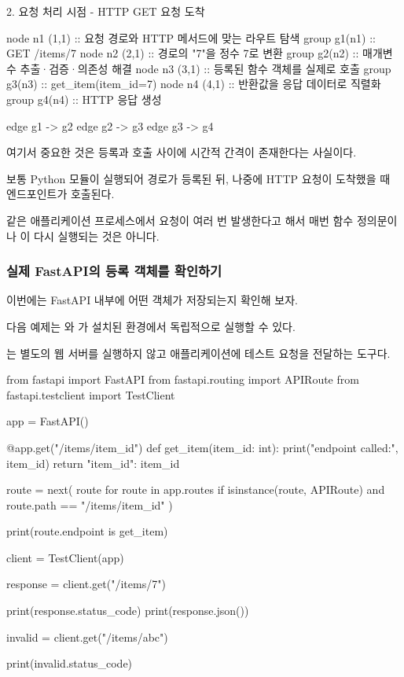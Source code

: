 \begin{dhknote}
\begin{dhksmry}[centered]
2. 요청 처리 시점 - HTTP GET 요청 도착
\end{dhksmry}
\end{dhknote}

\begin{dhkgraph}[uniform]
node n1 (1,1) :: 요청 경로와 HTTP 메서드에 맞는 라우트 탐색
group g1(n1) :: GET /items/7 
node n2 (2,1) :: 경로의 "7"을 정수 7로 변환
group g2(n2) :: 매개변수 추출·검증·의존성 해결 
node n3 (3,1) :: 등록된 함수 객체를 실제로 호출
group g3(n3) :: get_item(item_id=7)
node n4 (4,1) :: 반환값을 응답 데이터로 직렬화
group g4(n4) :: HTTP 응답 생성

edge g1 -> g2
edge g2 -> g3
edge g3 -> g4
\end{dhkgraph}

여기서 중요한 것은 등록과 호출 사이에 시간적 간격이 존재한다는 사실이다.

보통 Python 모듈이 실행되어 경로가 등록된 뒤, 나중에 HTTP 요청이 도착했을 때 엔드포인트가 호출된다.

같은 애플리케이션 프로세스에서 요청이 여러 번 발생한다고 해서 매번 함수 정의문이나 이 다시 실행되는 것은 아니다.

\subsubsection{실제 FastAPI의 등록 객체를 확인하기}

이번에는 FastAPI 내부에 어떤 객체가 저장되는지 확인해 보자.

다음 예제는 와 가 설치된 환경에서 독립적으로 실행할 수 있다.

는 별도의 웹 서버를 실행하지 않고 애플리케이션에 테스트 요청을 전달하는 도구다.

\begin{dhkcode}
from fastapi import FastAPI
from fastapi.routing import APIRoute
from fastapi.testclient import TestClient

app = FastAPI()

@app.get("/items/{item_id}")
def get_item(item_id: int):
    print("endpoint called:", item_id)
    return {"item_id": item_id}

route = next(
    route
    for route in app.routes
    if isinstance(route, APIRoute)
    and route.path == "/items/{item_id}"
)

print(route.endpoint is get_item)

client = TestClient(app)

response = client.get("/items/7")

print(response.status_code)
print(response.json())

invalid = client.get("/items/abc")

print(invalid.status_code)
\end{dhkcode}

